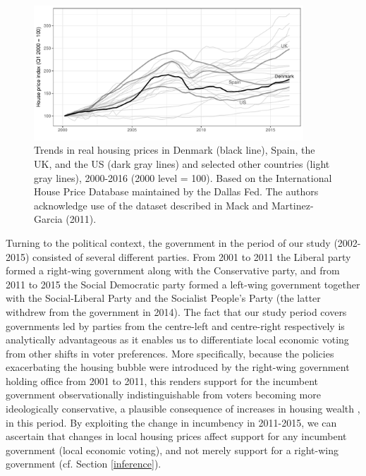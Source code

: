 \documentclass[12pt,a4paper]{article}
\begin{document}
	\begin{figure}[htbp!]
		\includegraphics[width=0.9\textwidth]{../figures/timeplot}
		\centering
		\caption{Trends in real housing prices in Denmark (black line), Spain, the UK, and the US (dark gray lines) and selected other countries (light gray lines), 2000-2016 (2000 level = 100). Based on the International House Price Database maintained by the Dallas Fed. The authors acknowledge use of the dataset described in Mack and Martinez-Garcia (2011).}\label{hpd}
	\end{figure}

	Turning to the political context, the government in the period of our study (2002-2015) consisted of several different parties. From 2001 to 2011 the Liberal party formed a right-wing government along with the Conservative party, and from 2011 to 2015 the Social Democratic party formed a left-wing government together with the Social-Liberal Party and the Socialist People’s Party (the latter withdrew from the government in 2014). The fact that our study period covers governments led by parties from the centre-left and centre-right respectively is analytically advantageous as it enables us to differentiate local economic voting from other shifts in voter preferences. More specifically, because the policies exacerbating the housing bubble were introduced by the right-wing government holding office from 2001 to 2011, this renders support for the incumbent government observationally indistinguishable from voters becoming more ideologically conservative, a plausible consequence of increases in housing wealth \citep{ansell2014political}, in this period. By exploiting the change in incumbency in 2011-2015, we can ascertain that changes in local housing prices affect support for any incumbent government (local economic voting), and not merely support for a right-wing government (cf. Section \ref{inference}). 
	
\end{document}
